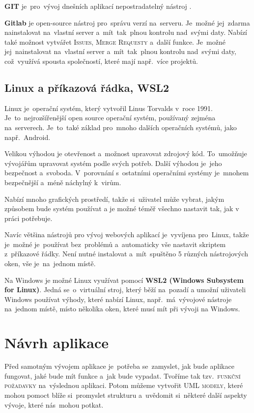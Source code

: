 \documentclass[14pt,a4paper]{article}
\begin{document}
        \textbf{GIT} je~pro~vývoj dnešních aplikací nepostradatelný nástroj \parencite{gitscmBook}.
        
        \textbf{Gitlab} je open-source nástroj pro~správu verzí na~serveru. Je~možné jej~zdarma nainstalovat na~vlastní server a~mít~tak~plnou kontrolu nad~svými daty. Nabízí také možnost vytvářet \textsc{Issues}, \textsc{Merge Requesty} a~další funkce. Je~možné jej~nainstalovat na~vlastní server a~mít~tak~plnou kontrolu nad~svými daty, což~využívá spousta společností, které mají např.~více projektů.

        \subsection{Linux a příkazová řádka, WSL2}
        Linux je~operační systém, který vytvořil Linus Torvalds v~roce 1991. Je~to~nejrozšířenější open source operační systém,
        používaný zejména na~serverech. Je~to~také základ pro~mnoho dalších operačních systémů, jako např.~Android.
        
        Velikou výhodou je otevřenost a~možnost upravovat zdrojový kód. To~umožňuje vývojářům upravovat systém podle svých potřeb.
        Další výhodou je~jeho bezpečnost a~svoboda. V~porovnání s~ostatními operačními systémy je~mnohem bezpečnější a~méně náchylný k~virům.

        Nabízí mnoho grafických prostředí, takže si~uživatel může vybrat, jakým způsobem bude systém používat a je možné téměř
        všechno nastavit tak, jak v práci potřebuje.

        Navíc většina nástrojů pro vývoj webových aplikací je~vyvíjena pro~Linux, takže je~možné je~používat bez~problémů a~automaticky vše nastavit skriptem z~příkazové řádky. Není nutné instalovat a~mít~spuštěno 5 různých nástrojových oken, vše je~na~jednom místě.

        Na Windows je možné Linux využívat pomocí \textbf{WSL2 (Windows Subsystem for Linux)}. Jedná se~o~virtuální stroj, který běží na~pozadí a umožní uživateli Windows používat výhody, které nabízí Linux, např.~má~vývojové nástroje na~jednom místě, místo několika oken, které musí mít při vývoji na Windows.

	\section{Návrh aplikace}
        Před samotným vývojem aplikace je~potřeba se~zamyslet, jak bude aplikace fungovat, jaké bude mít funkce a~jak bude vypadat. Tvoříme tak tzv.~\textsc{funkční požadavky} na~výslednou aplikaci. Potom můžeme vytvořit \textsc{UML modely}, které mohou pomoct blíže si~promyslet strukturu a~uvědomit si~některé další aspekty vývoje, které nás~mohou potkat.
\end{document}
